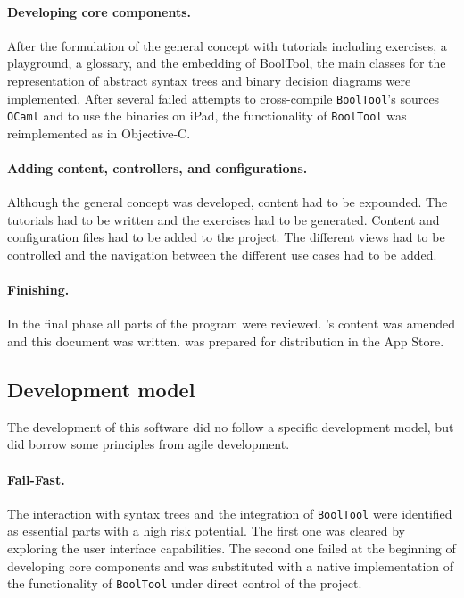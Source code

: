 \paragraph{Developing core components.}


After the formulation of the general concept with tutorials including 
exercises, a playground, a glossary, and the embedding of BoolTool,
the main classes for the representation of abstract syntax trees and binary decision diagrams were implemented.
After several failed attempts to cross-compile \verb=BoolTool='s sources \verb+OCaml+ 
and to use the binaries on iPad, the functionality of \verb+BoolTool+ was reimplemented as \BoolTool in Objective-C.

\paragraph{Adding content, controllers, and configurations.}

Although the general concept was developed, content had to be expounded. 
The tutorials had to be written and the exercises had to be generated. 
Content and configuration files had to be added to the project. 
The different views had to be controlled and the navigation between the different use cases had to be added. 

\paragraph{Finishing.} In the final phase all parts of the program were reviewed.
\Nyaya's content was amended and this document was written. 
\Nyaya was prepared for distribution in the App Store.

\subsection{Development model}

The development of this software did no follow a specific development model, 
but did borrow some principles from agile development.

\paragraph{Fail-Fast.} The interaction with syntax trees and 
the integration of \verb=BoolTool= were identified as essential parts with a high risk potential. 
The first one was cleared by exploring the user interface capabilities.
The second one failed at the beginning of developing core components 
and was substituted with a native implementation of the functionality of \verb=BoolTool=
under direct control of the project.

